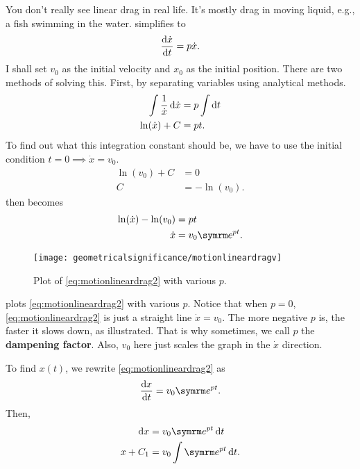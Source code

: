 You don't really see linear drag in real life. It's mostly drag in moving liquid, e.g., a fish swimming in the water.  simplifies to
\begin{equation*}
    \odv{\dot{x}}{t} = p\dot{x}.
\end{equation*}
I shall set $v_0$ as the initial velocity and $x_0$ as the initial position. There are two methods of solving this. First, by separating variables using analytical methods.
\begin{align}
    \int\frac{1}{\dot{x}}\odif{\dot{x}} &= p\int\odif{t} \nonumber\\
    \ln(\dot{x}) + C &= pt. \label{eq:motionlineardrag1}
\end{align}
To find out what this integration constant should be, we have to use the initial condition $t = 0 \implies \dot{x} = v_0$.
\begin{align*}
    \ln(v_0) + C &= 0 \\
    C &= -\ln(v_0).
\end{align*}
 then becomes
\begin{align}
    \ln(\dot{x}) - \ln(v_0) &= pt \nonumber\\
    \dot{x} &= v_0\e^{pt}. \label{eq:motionlineardrag2}
\end{align}

\begin{figure}
    \centering
    \texttt{[image: geometricalsignificance/motionlineardragv]}
    \caption{Plot of \cref{eq:motionlineardrag2} with various $p$.}
    \label{fig:motionlineardragv}
\end{figure}
 plots \cref{eq:motionlineardrag2} with various $p$. Notice that when $p = 0$, \cref{eq:motionlineardrag2} is just a straight line $\dot{x} = v_0$. The more negative $p$ is, the faster it slows down, as illustrated. That is why sometimes, we call $p$ the \textbf{dampening factor}. Also, $v_0$ here just scales the graph in the $\dot{x}$ direction.

To find $x(t)$, we rewrite \cref{eq:motionlineardrag2} as
\begin{equation*}
    \odv{x}{t} = v_0\e^{pt}.
\end{equation*}
Then,
\begin{align}
    \odif{x} &= v_0\e^{pt}\odif{t} \\
    x + C_1 &= v_0\int \e^{pt}\odif{t}. \label{eq:motionlineardrag3}
\end{align}

